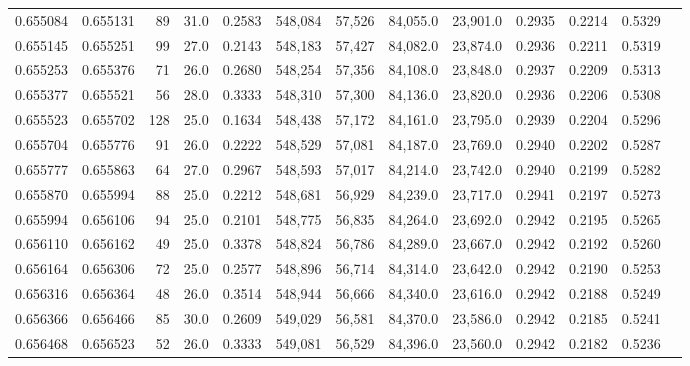 \begin{tabular}{rrrrrrrrrrrrr}
0.655084 & 0.655131 &    89 & 31.0 &                                     0.2583 & 548,084 &  57,526 &  84,055.0 &  23,901.0 & 0.2935 & 0.2214 & 0.5329 \\
0.655145 & 0.655251 &    99 & 27.0 &                                     0.2143 & 548,183 &  57,427 &  84,082.0 &  23,874.0 & 0.2936 & 0.2211 & 0.5319 \\
0.655253 & 0.655376 &    71 & 26.0 &                                     0.2680 & 548,254 &  57,356 &  84,108.0 &  23,848.0 & 0.2937 & 0.2209 & 0.5313 \\
0.655377 & 0.655521 &    56 & 28.0 &                                     0.3333 & 548,310 &  57,300 &  84,136.0 &  23,820.0 & 0.2936 & 0.2206 & 0.5308 \\
0.655523 & 0.655702 &   128 & 25.0 &                                     0.1634 & 548,438 &  57,172 &  84,161.0 &  23,795.0 & 0.2939 & 0.2204 & 0.5296 \\
0.655704 & 0.655776 &    91 & 26.0 &                                     0.2222 & 548,529 &  57,081 &  84,187.0 &  23,769.0 & 0.2940 & 0.2202 & 0.5287 \\
0.655777 & 0.655863 &    64 & 27.0 &                                     0.2967 & 548,593 &  57,017 &  84,214.0 &  23,742.0 & 0.2940 & 0.2199 & 0.5282 \\
0.655870 & 0.655994 &    88 & 25.0 &                                     0.2212 & 548,681 &  56,929 &  84,239.0 &  23,717.0 & 0.2941 & 0.2197 & 0.5273 \\
0.655994 & 0.656106 &    94 & 25.0 &                                     0.2101 & 548,775 &  56,835 &  84,264.0 &  23,692.0 & 0.2942 & 0.2195 & 0.5265 \\
0.656110 & 0.656162 &    49 & 25.0 &                                     0.3378 & 548,824 &  56,786 &  84,289.0 &  23,667.0 & 0.2942 & 0.2192 & 0.5260 \\
0.656164 & 0.656306 &    72 & 25.0 &                                     0.2577 & 548,896 &  56,714 &  84,314.0 &  23,642.0 & 0.2942 & 0.2190 & 0.5253 \\
0.656316 & 0.656364 &    48 & 26.0 &                                     0.3514 & 548,944 &  56,666 &  84,340.0 &  23,616.0 & 0.2942 & 0.2188 & 0.5249 \\
0.656366 & 0.656466 &    85 & 30.0 &                                     0.2609 & 549,029 &  56,581 &  84,370.0 &  23,586.0 & 0.2942 & 0.2185 & 0.5241 \\
0.656468 & 0.656523 &    52 & 26.0 &                                     0.3333 & 549,081 &  56,529 &  84,396.0 &  23,560.0 & 0.2942 & 0.2182 & 0.5236 \\

\end{tabular}
